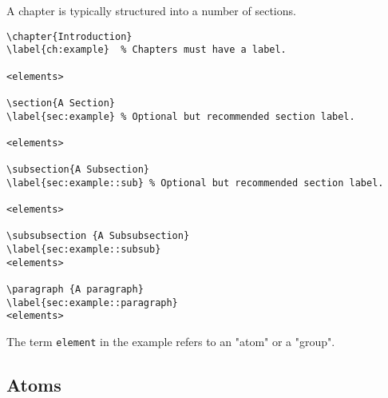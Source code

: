 \begin{example}[Sections]

A chapter is typically structured into a number of sections.

\begin{lstlisting}
\chapter{Introduction}
\label{ch:example}  % Chapters must have a label.
   
<elements>

\section{A Section}
\label{sec:example} % Optional but recommended section label.   

<elements>

\subsection{A Subsection}
\label{sec:example::sub} % Optional but recommended section label.   

<elements>

\subsubsection {A Subsubsection}
\label{sec:example::subsub}
<elements>

\paragraph {A paragraph}
\label{sec:example::paragraph}
<elements>

\end{lstlisting}

The term \lstinline`element` in the example refers to an "atom" or a "group".
\end{example}



\subsection{Atoms}
\label{sec:mtl::atoms}


